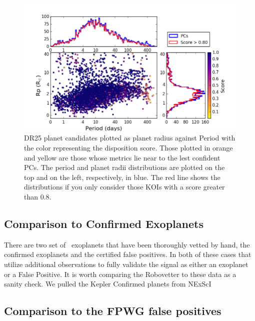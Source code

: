\begin{figure}
    \centering
    \includegraphics[width=1.1\linewidth]{fig-radiusPeriodScore-hist.png}
    \caption{DR25 planet candidates plotted as planet radius against Period with the color representing the disposition score. Those plotted in orange and yellow are those whose metrics lie near to the lest confident PCs.  The period and planet radii distributions are plotted on the top and on the left, respectively, in blue. The red line shows the distributions if you only consider those KOIs with a score greater than 0.8. }
    \label{f:catalogPlot}
\end{figure}






\subsection{Comparison to Confirmed Exoplanets}
There are two set of \Kepler\ exoplanets that have been thoroughly vetted by hand, the confirmed exoplanets and the certified false positives.  In both of these cases that utilize additional observations to fully validate the signal as either an exoplanet or a False Positive.  It is worth comparing the Robovetter to these data as a sanity check.  We pulled the Kepler Confirmed planets from NExScI

\subsection{Comparison to the FPWG false positives}



